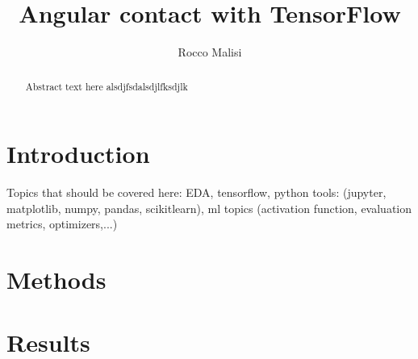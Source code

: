 \documentclass[letterpaper,10pt]{article}
\title{Angular contact with TensorFlow}
\author{Rocco Malisi}
\begin{document}
	\maketitle
	\newpage
	
	\begin{abstract}
		Abstract text here alsdjfsdalsdjlfksdjlk
	\end{abstract}
	\newpage
	
	\tableofcontents
	\newpage
	
	\section{Introduction}
	Topics that should be covered here: EDA, tensorflow, python tools: (jupyter, matplotlib, numpy, pandas, scikitlearn), ml topics (activation function, evaluation metrics, optimizers,...)
	\section{Methods}
	\section{Results}
\end{document}
